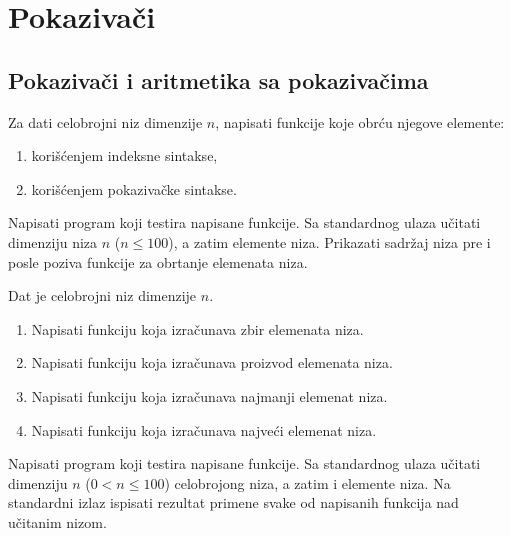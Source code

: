 \chapter{Pokazivači}

\section{Pokazivači i aritmetika sa pokazivačima}


\begin{Exercise}[label=301]
Za dati celobrojni niz dimenzije $n$, napisati funkcije koje
obrću njegove elemente:
\begin{enumerate}
\item korišćenjem indeksne sintakse,
\item korišćenjem pokazivačke sintakse.
\end{enumerate}
Napisati program koji testira napisane funkcije. Sa standardnog
ulaza učitati dimenziju niza $n$ ($n \leq 100$), a zatim
elemente niza. Prikazati sadržaj niza pre i posle poziva
funkcije za obrtanje elemenata niza.
\end{Exercise}
\begin{Answer}[ref=301]
\end{Answer}

\begin{Exercise}[label=302]
Dat je celobrojni niz dimenzije $n$. 
\begin{enumerate}
\item Napisati funkciju  koja izračunava zbir elemenata niza.
\item Napisati funkciju  koja izračunava proizvod elemenata niza.
\item Napisati funkciju   koja izračunava najmanji elemenat niza.
\item Napisati funkciju   koja izračunava najveći elemenat niza.
\end{enumerate}
Napisati program koji testira napisane funkcije. Sa standardnog
ulaza učitati dimenziju $n$ 
($0 < n \leq 100$) celobrojong
niza, a zatim i elemente niza. Na standardni izlaz ispisati
rezultat primene svake od napisanih funkcija nad učitanim
nizom.
\end{Exercise}
\begin{Answer}[ref=302]
\end{Answer}


